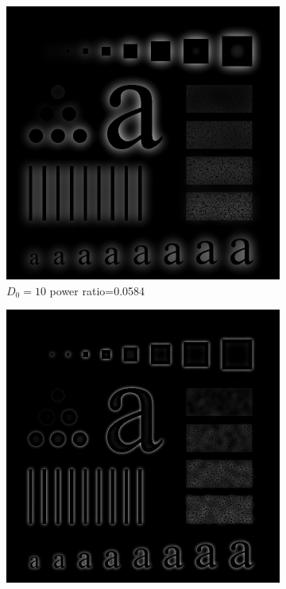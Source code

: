 \begin{figure}[h!]
	\centering
	\begin{subfigure}[b]{0.3\linewidth}
		\includegraphics[width=\linewidth]{myfigure/p3/BHPF_10.png}
		\caption{$D_0=10$ power ratio=0.0584}
		\label{fig:BHPF_10}
	\end{subfigure}
  	\begin{subfigure}[b]{0.3\linewidth}
		\includegraphics[width=\linewidth]{myfigure/p3/BHPF_30.png}

\end{subfigure}
\end{figure}
